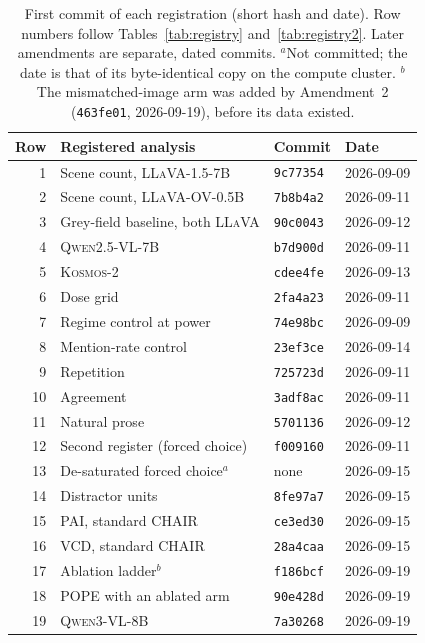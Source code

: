 \begin{table}[htbp]
\caption{First commit of each registration (short hash and date). Row
numbers follow Tables~\ref{tab:registry} and~\ref{tab:registry2}. Later amendments are separate, dated
commits. $^{a}$Not committed; the date is that of its byte-identical copy on the compute cluster.
$^{b}$The mismatched-image arm was added by Amendment~2 (\texttt{463fe01}, 2026-09-19), before its data
existed.}
\label{tab:reghash}
\begin{center}
\small
\begin{tabular}{rlll}
\toprule
Row & Registered analysis & Commit & Date \\
\midrule
1  & Scene count, \textsc{LLaVA-1.5-7B}          & \texttt{9c77354} & 2026-09-09 \\
2  & Scene count, \textsc{LLaVA-OV-0.5B}         & \texttt{7b8b4a2} & 2026-09-11 \\
3  & Grey-field baseline, both \textsc{LLaVA}     & \texttt{90c0043} & 2026-09-12 \\
4  & \textsc{Qwen2.5-VL-7B}                       & \texttt{b7d900d} & 2026-09-11 \\
5  & \textsc{Kosmos-2}                            & \texttt{cdee4fe} & 2026-09-13 \\
6  & Dose grid                                    & \texttt{2fa4a23} & 2026-09-11 \\
7  & Regime control at power                      & \texttt{74e98bc} & 2026-09-09 \\
8  & Mention-rate control                         & \texttt{23ef3ce} & 2026-09-14 \\
9  & Repetition                                   & \texttt{725723d} & 2026-09-11 \\
10 & Agreement                                    & \texttt{3adf8ac} & 2026-09-11 \\
11 & Natural prose                                & \texttt{5701136} & 2026-09-12 \\
12 & Second register (forced choice)              & \texttt{f009160} & 2026-09-11 \\
13 & De-saturated forced choice$^{a}$             & none            & 2026-09-15 \\
14 & Distractor units                             & \texttt{8fe97a7} & 2026-09-15 \\
15 & PAI, standard CHAIR                          & \texttt{ce3ed30} & 2026-09-15 \\
16 & VCD, standard CHAIR                          & \texttt{28a4caa} & 2026-09-15 \\
17 & Ablation ladder$^{b}$                        & \texttt{f186bcf} & 2026-09-19 \\
18 & POPE with an ablated arm                     & \texttt{90e428d} & 2026-09-19 \\
19 & \textsc{Qwen3-VL-8B}                         & \texttt{7a30268} & 2026-09-19 \\
\bottomrule
\end{tabular}
\end{center}
\end{table}

